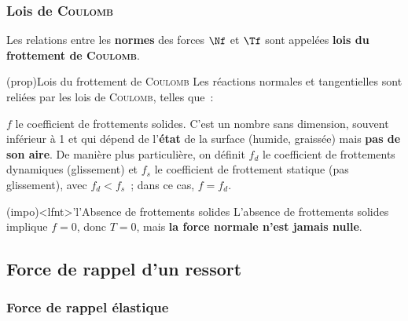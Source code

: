 \documentclass[../../main/main.tex]{subfiles}
\begin{document}
\subsubsection{Lois de \textsc{Coulomb}}
Les relations entre les \textbf{normes} des forces $\Nf$ et $\Tf$ sont appelées
\textbf{lois du frottement de \textsc{Coulomb}}.

\begin{tcb*}(prop){Lois du frottement de \textsc{Coulomb}}
	Les réactions normales et tangentielles sont reliées par les lois de
	\textsc{Coulomb}, telles que~:
	\smallbreak
	\begin{isd}
		\psw{
			\[
				\norm{\Tf} = f\norm{\Nf}
				\qou
				\norm{\Tf} = f_d \norm{\Nf}
			\]
		}
		\tcblower
		\psw{
			\[
				\norm{\Tf} < f\norm{\Nf}
				\qou
				\norm{\Tf} = f_s \norm{\Nf}
			\]
		}
	\end{isd}
	$f$ le coefficient de frottements solides. C'est un nombre sans
	dimension, souvent inférieur à 1 et qui dépend de l'\textbf{état} de la
	surface (humide, graissée) mais \textbf{pas de son aire}.
	\bigbreak
	De manière plus particulière, on définit $f_d$ le coefficient de frottements
	dynamiques (glissement) et $f_s$ le coefficient de frottement statique (pas
	glissement), avec $f_d < f_s$~; dans ce cas, $f = f_d$.
\end{tcb*}

\begin{tcb*}(impo)<lfnt>'l'{Absence de frottements solides}
	L'absence de frottements solides implique $f=0$, donc $T = 0$, mais
	\textbf{la force normale n'est jamais nulle}.
\end{tcb*}

\subsection{Force de rappel d'un ressort}
\subsubsection{Force de rappel élastique}
\end{document}
